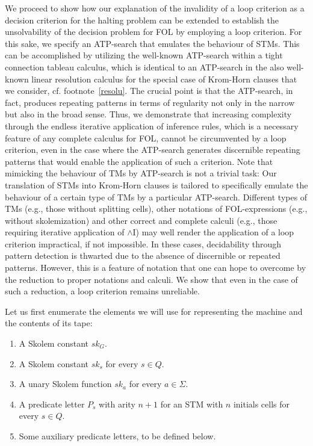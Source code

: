 \documentclass[%
  manuscript=article,   %
  year=2024,
  volume=77,
  doi=10.59203/zfn.77.694,
]{zfn}
\begin{document}
We proceed to show how our explanation of the invalidity of a loop criterion as a decision criterion for the halting problem can be extended to establish the unsolvability of the decision problem for FOL by employing a loop criterion. For this sake, we specify an ATP-search that emulates the behaviour of STMs. This can be accomplished by utilizing the well-known ATP-search within a tight connection tableau calculus, which is identical to an ATP-search in the also well-known linear resolution calculus for the special case of Krom-Horn clauses that we consider, cf. footnote~\ref{resolu}. The crucial point is that the ATP-search, in fact, produces repeating patterns in terms of regularity not only in the narrow but also in the broad sense. Thus, we demonstrate that increasing complexity through the endless iterative application of inference rules, which is a necessary feature of any complete calculus for FOL, cannot be circumvented by a loop criterion, even in the case where the ATP-search generates discernible repeating patterns that would enable the application of such a criterion. Note that mimicking the behaviour of TMs by ATP-search is not a trivial task: Our translation of STMs into Krom-Horn clauses is tailored to specifically emulate the behaviour of a certain type of TMs by a particular ATP-search. Different types of TMs (e.g., those without splitting cells), other notations of FOL-expressions (e.g., without skolemization) and other correct and complete calculi (e.g., those requiring iterative application of $\wedge$I) may well render the application of a loop criterion impractical, if not impossible. In these cases, decidability through pattern detection is thwarted due to the absence of discernible or repeated patterns. However, this is a feature of notation that one can hope to overcome by the reduction to proper notations and calculi. We show that even in the case of such a reduction, a loop criterion remains unreliable.

Let us first enumerate the elements we will use for representing the machine and the contents of its tape:

\begin{enumerate}
\item A Skolem constant $sk_G$.
\item A Skolem constant $sk_s$ for every $s \in Q$. \label{sks}
\item A unary Skolem function $sk_a$ for every $a \in \Sigma$. 
\item A predicate letter $P_s$ with arity $n+1$ for an STM with $n$ initials cells for every $s \in Q$.
\item Some auxiliary predicate letters, to be defined below.
\end{enumerate}
\end{document}

